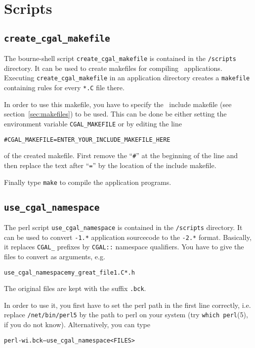 \section{Scripts}

\subsection{\texttt{create\_cgal\_makefile}}\label{sec:create_cgal_makefile}

The bourne-shell script \texttt{create\_cgal\_makefile} is contained
in the \cgaldir\texttt{/scripts} directory. It can be used to create
makefiles for compiling \cgal\ applications. Executing
\texttt{create\_cgal\_makefile} in an application directory creates a
\texttt{makefile} containing rules for every \texttt{*.C} file there.

In order to use this makefile, you have to specify the \cgal\ include
makefile (see section~\ref{sec:makefiles}) to be used. This can be
done be either setting the environment variable
\texttt{CGAL\_MAKEFILE} or by editing the line
\begin{alltt}
  # CGAL_MAKEFILE = ENTER_YOUR_INCLUDE_MAKEFILE_HERE
\end{alltt}
of the created makefile. First remove the ``\texttt{\#}'' at the
beginning of the line and then replace the text after ``\texttt{=}''
by the location of the include makefile. 

Finally type \texttt{make} to compile the application programs.

\subsection{\texttt{use\_cgal\_namespace}}\label{sec:use_cgal_namespace}

The perl script \texttt{use\_cgal\_namespace} is contained in the
\cgaldir\texttt{/scripts} directory. It can be used to convert
\cgal\texttt{-1.*} application sourcecode to the \cgal\texttt{-2.*}
format.  Basically, it replaces \texttt{CGAL\_} prefixes by
\texttt{CGAL::} namespace qualifiers. You have to give the files to
convert as arguments, e.g.
\begin{alltt}
  use_cgal_namespace my_great_file1.C *.h
\end{alltt}
The original files are kept with the suffix \texttt{.bck}.

In order to use it, you first have to set the perl path in the first
line correctly, i.e. replace \texttt{/net/bin/perl5} by the path to
perl on your system (try \texttt{which perl}(5), if you do not know).
Alternatively, you can type
\begin{alltt}
  perl -wi.bck -- use_cgal_namespace <FILES>
\end{alltt}


